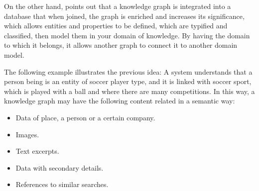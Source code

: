 On the other hand, \cite{Saorin} points out that a knowledge graph is integrated into a database that when joined, the graph is enriched and increases its significance, which allows entities and properties to be defined, which are typified and classified, then model them in your domain of knowledge. By having the domain to which it belongs, it allows another graph to connect it to another domain model.

The following example illustrates the previous idea: A system understands that a person being is an entity of soccer player type, and it is linked with soccer sport, which is played with a ball and where there are many competitions. In this way, a knowledge graph may have the following content related in a semantic way:

\begin{itemize}
\item Data of place, a person or a certain company.
\item Images.
\item Text excerpts.
\item Data with secondary details.
\item References to similar searches.
\end{itemize}

